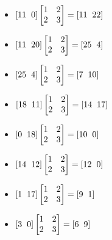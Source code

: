 \begin{multicols}{2}
\begin{itemize}
    \item $\left[11\hspace{2mm}0\right]\begin{bmatrix}1 & 2 \\ 2 & 3 \end{bmatrix}=\left[11\hspace{2mm}22\right]$
    \item $\left[11\hspace{2mm}20\right]\begin{bmatrix}1 & 2 \\ 2 & 3 \end{bmatrix}=\left[25\hspace{2mm}4\right]$
    \item $\left[25\hspace{2mm}4\right]\begin{bmatrix}1 & 2 \\ 2 & 3 \end{bmatrix}=\left[7\hspace{2mm}10\right]$
    \item $\left[18\hspace{2mm}11\right]\begin{bmatrix}1 & 2 \\ 2 & 3 \end{bmatrix}=\left[14\hspace{2mm}17\right]$
    \item $\left[0\hspace{2mm}18\right]\begin{bmatrix}1 & 2 \\ 2 & 3 \end{bmatrix}=\left[10\hspace{2mm}0\right]$
    \item $\left[14\hspace{2mm}12\right]\begin{bmatrix}1 & 2 \\ 2 & 3 \end{bmatrix}=\left[12\hspace{2mm}0\right]$
    \item $\left[1\hspace{2mm}17\right]\begin{bmatrix}1 & 2 \\ 2 & 3 \end{bmatrix}=\left[9\hspace{2mm}1\right]$
    \item $\left[3\hspace{2mm}0\right]\begin{bmatrix}1 & 2 \\ 2 & 3 \end{bmatrix}=\left[6\hspace{2mm}9\right]$

\end{itemize}
\end{multicols}
